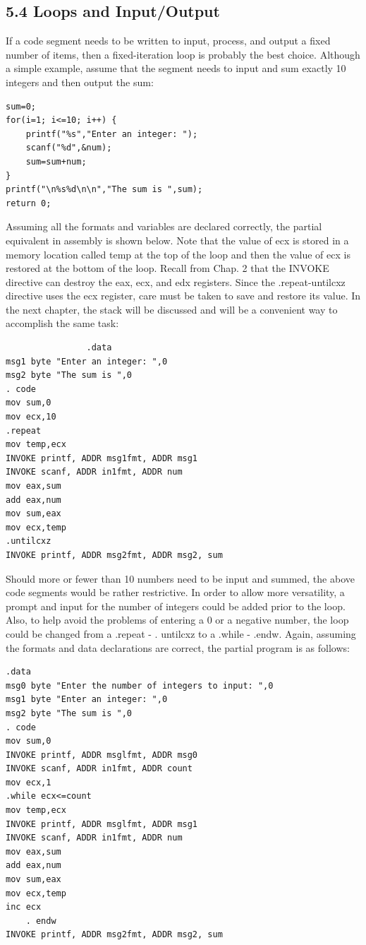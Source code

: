 \documentclass[10pt]{book}
\begin{document}
\subsection*{5.4 Loops and Input/Output}
If a code segment needs to be written to input, process, and output a fixed number of items, then a fixed-iteration loop is probably the best choice. Although a simple example, assume that the segment needs to input and sum exactly 10 integers and then output the sum:


\begin{verbatim}
sum=0;
for(i=1; i<=10; i++) {
    printf("%s","Enter an integer: ");
    scanf("%d",&num);
    sum=sum+num;
}
printf("\n%s%d\n\n","The sum is ",sum);
return 0;
\end{verbatim}

Assuming all the formats and variables are declared correctly, the partial equivalent in assembly is shown below. Note that the value of ecx is stored in a memory location called temp at the top of the loop and then the value of ecx is restored at the bottom of the loop. Recall from Chap. 2 that the INVOKE directive can destroy the eax, ecx, and edx registers. Since the .repeat-untilcxz directive uses the ecx register, care must be taken to save and restore its value. In the next chapter, the stack will be discussed and will be a convenient way to accomplish the same task:

\begin{verbatim}
                .data
msg1 byte "Enter an integer: ",0
msg2 byte "The sum is ",0
. code
mov sum,0
mov ecx,10
.repeat
mov temp,ecx
INVOKE printf, ADDR msg1fmt, ADDR msg1
INVOKE scanf, ADDR in1fmt, ADDR num
mov eax,sum
add eax,num
mov sum,eax
mov ecx,temp
.untilcxz
INVOKE printf, ADDR msg2fmt, ADDR msg2, sum
\end{verbatim}

Should more or fewer than 10 numbers need to be input and summed, the above code segments would be rather restrictive. In order to allow more versatility, a prompt and input for the number of integers could be added prior to the loop. Also, to help avoid the problems of entering a 0 or a negative number, the loop could be changed from a .repeat - . untilcxz to a .while - .endw. Again, assuming the formats and data declarations are correct, the partial program is as follows:

\begin{verbatim}
.data
msg0 byte "Enter the number of integers to input: ",0
msg1 byte "Enter an integer: ",0
msg2 byte "The sum is ",0
. code
mov sum,0
INVOKE printf, ADDR msglfmt, ADDR msg0
INVOKE scanf, ADDR in1fmt, ADDR count
mov ecx,1
.while ecx<=count
mov temp,ecx
INVOKE printf, ADDR msglfmt, ADDR msg1
INVOKE scanf, ADDR in1fmt, ADDR num
mov eax,sum
add eax,num
mov sum,eax
mov ecx,temp
inc ecx
    . endw
INVOKE printf, ADDR msg2fmt, ADDR msg2, sum
\end{verbatim}
\end{document}
